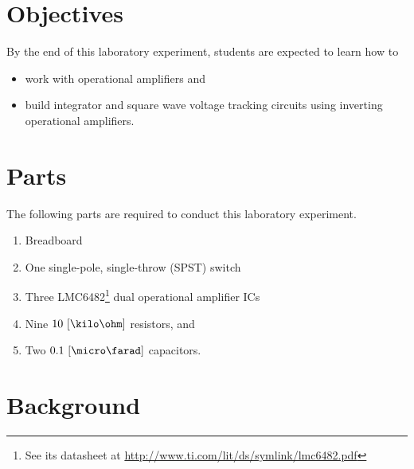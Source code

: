 

\section{Objectives}
By the end of this laboratory experiment, students are expected to learn how to 

\begin{itemize}

\item work with operational amplifiers and   
  
\item build integrator and square wave voltage tracking circuits using inverting operational amplifiers.  
 
  
\end{itemize}

\section{Parts}
\label{sec:partsEx9}
The following parts are required to conduct this laboratory experiment. %
%
\begin{enumerate}
\item Breadboard
\item One single-pole, single-throw (SPST) switch
\item Three LMC6482\footnote{See its datasheet at \href{http://www.ti.com/lit/ds/symlink/lmc6482.pdf}{http://www.ti.com/lit/ds/symlink/lmc6482.pdf}} dual operational amplifier ICs
  
\item Nine $10~[\kilo\ohm]$ resistors, and     
\item Two $0.1~[\micro\farad]$ capacitors.  
\end{enumerate}

\section{Background}
\label{sec:background}

